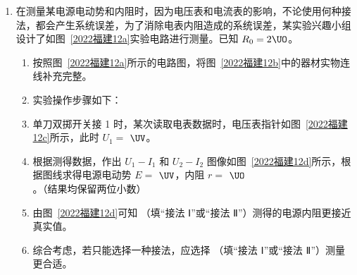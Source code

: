 \documentclass[\gkver]{gaokaozhenti}
\begin{document}
\begin{enumerate}
{

（2）由 $y-x^{2}$ 图线为一条倾斜的直线可知，小球下落的高度 $y$，与水平距离的平方 $x^{2}$ 成线性关系。

（3）根据平抛运动规律可得

$x=v_{0}t$

$y=\frac{1}{2}gt^{2}$

联立可得

$y=\frac{1}{2}g\left(\frac{x}{v_{0}}\right)^{2}=\frac{g}{2v_{0}^{2}}x^{2}$

可知 $y-x^{2}$ 图像的斜率为

$k=\frac{g}{2v_{0}^{2}}$

解得小球平抛运动的初速度为

$v_{0}=\sqrt{\frac{g}{2k}}$

（4）$y-x^{2}$ 图线是一条直线，但常不经过原点，说明实验中测量的 $y$ 值偏大或偏小一个定值，这是小球的水平射出点未与 $O$ 点重合，位于坐标原点 $O$ 上方或下方所造成的。
}

\item
在测量某电源电动势和内阻时，因为电压表和电流表的影响，不论使用何种接法，都会产生系统误差，为了消除电表内阻造成的系统误差，某实验兴趣小组设计了如图~\ref{2022福建12a}实验电路进行测量。已知 $R_{0}=2\UO$。

\begin{enumerate}
	\item
	按照图~\ref{2022福建12a}所示的电路图，将图~\ref{2022福建12b}中的器材实物连线补充完整。
	\item
	实验操作步骤如下：
	\item
	单刀双掷开关接 1 时，某次读取电表数据时，电压表指针如图~\ref{2022福建12c}所示，此时 $U_{1}=$  $\UV$。
	\item
	根据测得数据，作出 $U_{1}-I_{1}$ 和 $U_{2}-I_{2}$ 图像如图~\ref{2022福建12d}所示，根据图线求得电源电动势 $E=$  $\UV$，内阻 $r=$  $\UO$。（结果均保留两位小数）
	\item
	由图~\ref{2022福建12d}可知 （填“接法 Ⅰ”或“接法 Ⅱ”）测得的电源内阻更接近真实值。
	\item
	综合考虑，若只能选择一种接法，应选择 （填“接法 Ⅰ”或“接法 Ⅱ”）测量更合适。
\end{enumerate}


\end{enumerate}
\end{document}
